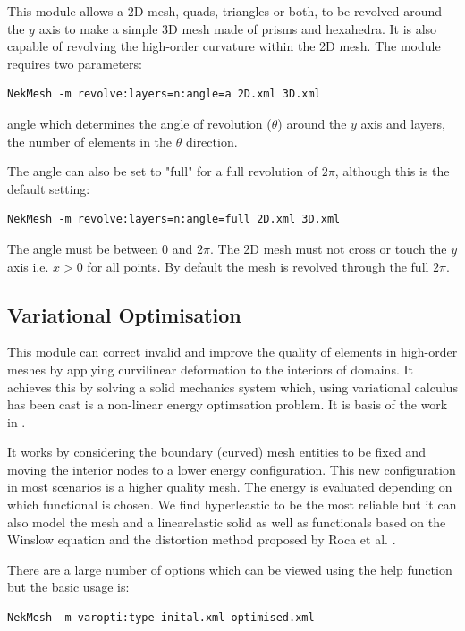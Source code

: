This module allows a 2D mesh, quads, triangles or both, to be revolved around
the $y$ axis to make a simple 3D mesh made of prisms and hexahedra. It is also
capable of revolving the high-order curvature within the 2D mesh. The module
requires two parameters:

\begin{lstlisting}[style=BashInputStyle]
  NekMesh -m revolve:layers=n:angle=a 2D.xml 3D.xml
\end{lstlisting}
angle which determines the angle of revolution ($\theta$) around the $y$ axis and 
layers, the number of elements in the $\theta$ direction.

The angle can also be set to "full" for a full revolution of $2\pi$, although
this is the default setting:

\begin{lstlisting}[style=BashInputStyle]
NekMesh -m revolve:layers=n:angle=full 2D.xml 3D.xml
\end{lstlisting}

The angle must be between $0$ and $2\pi$.
The 2D mesh must not cross or touch the $y$ axis i.e. $x>0$ for all points.
By default the mesh is revolved through the full $2\pi$.

\subsection{Variational Optimisation}
\label{sec:varopti}
This module can correct invalid and improve the quality of elements in
high-order meshes by applying curvilinear deformation to the interiors of
domains. It achieves this by solving a solid mechanics system which, using
variational calculus has been cast is a non-linear energy optimsation problem.
It is basis of the work in \cite{TuPeMo16}.

It works by considering the boundary (curved) mesh entities to be fixed and
moving the interior nodes to a lower  energy configuration. This new
configuration in most scenarios is a higher quality mesh. The energy is
evaluated depending on which functional is chosen. We find hyperleastic to be
the most reliable but it can also model the mesh and a linearelastic solid as
well as functionals based on the Winslow equation and the distortion method
proposed by Roca et al. \cite{GaRoPeSa15}.

There are a large number of options which can be viewed using the help function
but the basic usage is:
\begin{lstlisting}[style=BashInputStyle]
  NekMesh -m varopti:type inital.xml optimised.xml
\end{lstlisting}

